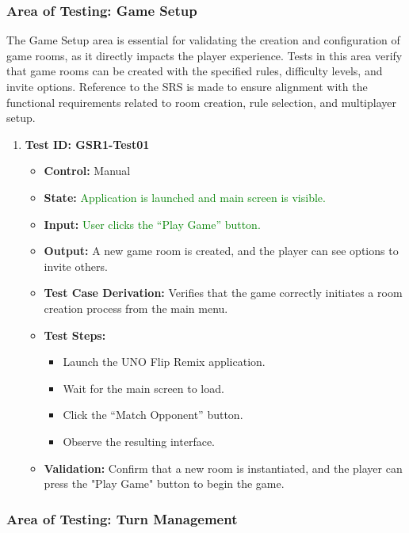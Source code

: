 \documentclass[12pt]{article}
\newcommand{\added}[1]{\textcolor{green}{#1}}
\begin{document}
\subsubsection{Area of Testing: Game Setup}

The Game Setup area is essential for validating the creation and configuration of game rooms, as it directly impacts the player experience. Tests in this area verify that game rooms can be created with the specified rules, difficulty levels, and invite options. Reference to the SRS is made to ensure alignment with the functional requirements related to room creation, rule selection, and multiplayer setup.

\begin{enumerate}
    \item \textbf{Test ID: GSR1-Test01}
    \begin{itemize}
        \item \textbf{Control:} Manual
        \item \textbf{State:} \added{Application is launched and main screen is visible.}
        \item \textbf{Input:} \added{User clicks the “Play Game” button.}
        \item \textbf{Output:} A new game room is created, and the player can see options to invite others.
        \item \textbf{Test Case Derivation:} Verifies that the game correctly initiates a room creation process from the main menu.
        \item \textbf{Test Steps:}
        \begin{itemize}
            \item Launch the UNO Flip Remix application.
            \item Wait for the main screen to load.
            \item Click the “Match Opponent” button.
            \item Observe the resulting interface.
        \end{itemize}
        \item \textbf{Validation:} Confirm that a new room is instantiated, and the player can press the "Play Game" button to begin the game.
    \end{itemize}
\end{enumerate}

\subsubsection{Area of Testing: Turn Management}
\end{document}

